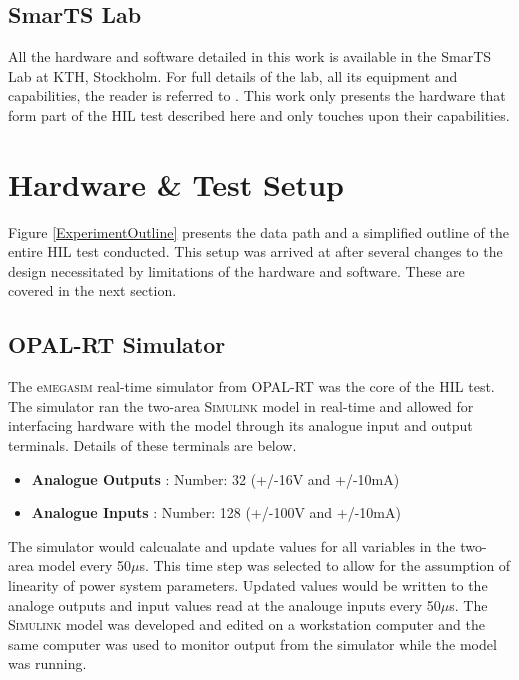 \documentclass[conference]{IEEEtran}
\begin{document}
\subsection{SmarTS Lab}
All the hardware and software detailed in this work is available in the SmarTS Lab at KTH, Stockholm. For full details of the lab, all its equipment and capabilities, the reader is referred to \cite{SmarTSLab}. This work only presents the hardware that form part of the HIL test described here and only touches upon their capabilities.

\section{Hardware \& Test Setup}\label{hardware}

Figure \ref{ExperimentOutline} presents the data path and a simplified outline of the entire HIL test conducted. This setup was arrived at after several changes to the design necessitated by limitations of the hardware and software. These are covered in the next section.

\subsection{OPAL-RT Simulator}
The e\textsc{megasim} real-time simulator from OPAL-RT\cite{OPALemegasim} was the core of the HIL test. The simulator ran the two-area \textsc{Simulink} model in real-time and allowed for interfacing hardware with the model through its analogue input and output terminals.  Details of these terminals are below.

\begin{itemize}
\item \textbf{Analogue Outputs} : Number: 32 (+/-16V and +/-10mA)
\item \textbf{Analogue Inputs} : Number: 128 (+/-100V and +/-10mA)
\end{itemize}

The simulator would calcualate and update values for all variables in the two-area model every 50$\mu$s. This time step was selected to allow for the assumption of linearity of power system parameters. Updated values would be written to the analoge outputs and input values read at the analouge inputs every 50$\mu$s. The \textsc{Simulink} model was developed and edited on a workstation computer and the same computer was used to monitor output from the simulator while the model was running.
\end{document}
